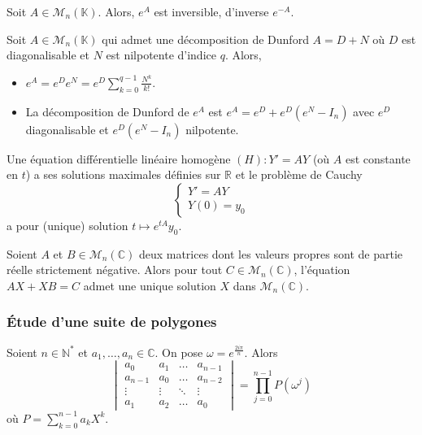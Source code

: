   \begin{corollary}
    Soit $A \in \mathcal{M}_n(\mathbb{K})$. Alors, $e^A$ est inversible, d'inverse $e^{-A}$.
  \end{corollary}

  \begin{example}
    Soit $A \in \mathcal{M}_n(\mathbb{K})$ qui admet une décomposition de Dunford $A = D+N$ où $D$ est diagonalisable et $N$ est nilpotente d'indice $q$. Alors,
    \begin{itemize}
      \item $e^A = e^D e^N = e^D \sum_{k=0}^{q-1} \frac{N^k}{k!}$.
      \item La décomposition de Dunford de $e^A$ est $e^A = e^D + e^D(e^N - I_n)$ avec $e^D$ diagonalisable et $e^D(e^N - I_n)$ nilpotente.
    \end{itemize}
  \end{example}


  \begin{application}
    Une équation différentielle linéaire homogène $(H) : Y' = AY$ (où $A$ est constante en $t$) a ses solutions maximales définies sur $\mathbb{R}$ et le problème de Cauchy
    \[ \begin{cases} Y' = AY \\ Y(0) = y_0 \end{cases} \]
    a pour (unique) solution $t \mapsto e^{tA} y_0$.
  \end{application}


  \begin{application}
    Soient $A$ et $B \in \mathcal{M}_n(\mathbb{C})$ deux matrices dont les valeurs propres sont de partie réelle strictement négative. Alors pour tout $C \in \mathcal{M}_n(\mathbb{C})$, l'équation $AX + XB = C$ admet une unique solution $X$ dans $\mathcal{M}_n(\mathbb{C})$.
  \end{application}

  \subsubsection{Étude d'une suite de polygones}


  \begin{lemma}
    Soient $n \in \mathbb{N}^*$ et $a_1, \dots, a_n \in \mathbb{C}$. On pose $\omega = e^{\frac{2i\pi}{n}}$. Alors
    \[ \begin{vmatrix} a_0 & a_1 & \dots & a_{n-1} \\ a_{n-1} & a_0 & \dots & a_{n-2}\\ \vdots & \vdots & \ddots & \vdots \\ a_1 & a_2 & \dots & a_0 \end{vmatrix} = \prod_{j=0}^{n-1} P(\omega^j) \]
    où $P = \sum_{k=0}^{n-1} a_k X^k$.
  \end{lemma}

